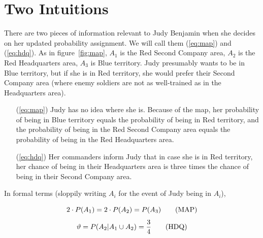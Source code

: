 \documentclass[smallextended]{svjour3}       %
\newcommand{\nial}{\noindent} %
\newcommand{\qvu}[0]{\vartheta}
\begin{document}
\section{Two Intuitions}
\label{TwoIntuitions}

There are two pieces of information relevant to Judy Benjamin
when she decides on her updated probability assignment. We will call
them ({\ref{eq:map}}) and ({\ref{eq:hdq}}). As in
figure~\ref{fig:map}, $A_{1}$ is the Red Second Company area, $A_{2}$ is
the Red Headquarters area, $A_{3}$ is Blue territory. Judy presumably
wants to be in Blue territory, but if she is in Red territory, she
would prefer their Second Company area (where enemy soldiers are not
as well-trained as in the Headquarters area).

\begin{enumerate}
\item[({\ref{eq:map}})] Judy has no idea where she is. Because of the
  map, her probability of being in Blue territory equals the
  probability of being in Red territory, and the probability of being
  in the Red Second Company area equals the probability of being in
  the Red Headquarters area.
\item[({\ref{eq:hdq}})] Her commanders inform Judy that in case she is in Red
  territory, her chance of being in their Headquarters area is three
  times the chance of being in their Second Company area.
\end{enumerate}

\nial In formal terms (sloppily writing $A_{i}$ for the event of Judy
being in $A_{i}$),

\begin{equation}
  \label{eq:map}
  2\cdot{}P(A_{1})=2\cdot{}P(A_{2})=P(A_{3})\tag{\mbox{MAP}}
\end{equation}
\begin{equation}
  \label{eq:hdq}
  {\qvu}=P(A_{2}|A_{1}\cup{}A_{2})=\frac{3}{4}\tag{\mbox{HDQ}}
\end{equation}
\end{document}
